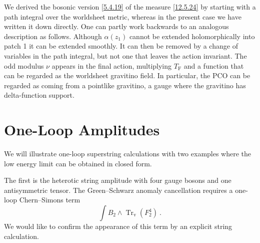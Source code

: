 We derived the bosonic version \eqref{5.4.19} of the measure \eqref{12.5.24} by starting with a path integral over the worldsheet metric, whereas in the present case we have written it down directly. One can partly work backwards to an analogous description as follows. Although $\alpha(z_1)$ cannot be extended holomorphically into patch 1 it can be extended smoothly. It can then be removed by a change of variables in the path integral, but not one that leaves the action invariant. The odd modulus $\nu$ appears in the final action, multiplying $T_{\mathrm{F}}$ and a function that can be regarded as the worldsheet gravitino field. In particular, the PCO can be regarded as coming from a pointlike gravitino, a gauge where the gravitino has delta-function support.

\section{One-Loop Amplitudes}

We will illustrate one-loop superstring calculations with two examples where the low energy limit can be obtained in closed form.

The first is the heterotic string amplitude with four gauge bosons and one antisymmetric tensor. The Green--Schwarz anomaly cancellation requires a one-loop Chern--Simons term
\begin{equation}
	\int B_{\textit{2}}\wedge \operatorname{Tr}_{\mathrm{v}}(F_{\textit{2}}^4) \:. \label{12.6.1}
\end{equation}
We would like to confirm the appearance of this term by an explicit string calculation.

